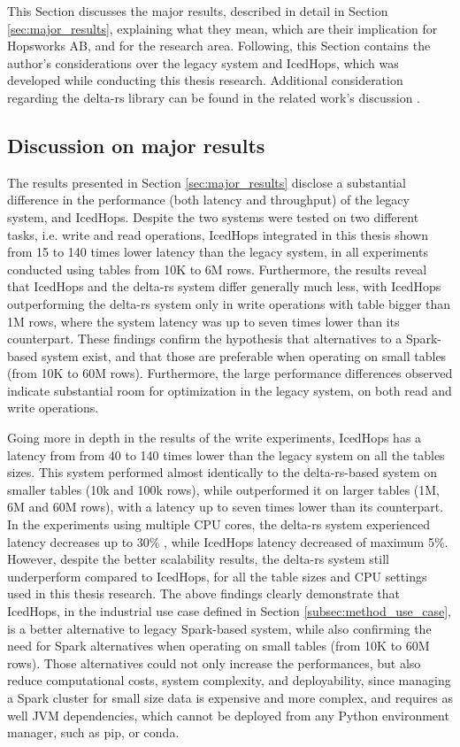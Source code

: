 This Section discusses the major results, described in detail in Section \ref{sec:major_results}, explaining what they mean, which are their implication for Hopsworks AB, and for the research area. Following, this Section contains the author's considerations over the legacy system and IcedHops, which was developed while conducting this thesis research. Additional consideration regarding the delta-rs library can be found in the related work's discussion \cite{manfrediReducingReadWrite2024}.



\subsection{Discussion on major results}
The results presented in Section \ref{sec:major_results} disclose a substantial difference in the performance (both latency and throughput) of the legacy system, and IcedHops. Despite the two systems were tested on two different tasks, i.e. write and read operations, IcedHops integrated in this thesis shown from 15 to 140 times lower latency than the legacy system, in all experiments conducted using tables from 10K to 6M rows. Furthermore, the results reveal that IcedHops and the delta-rs system differ generally much less, with IcedHops outperforming the delta-rs system only in write operations with table bigger than 1M rows, where the system latency was up to seven times lower than its counterpart. These findings confirm the hypothesis that alternatives to a Spark-based system exist, and that those are preferable when operating on small tables (from 10K to 60M rows). Furthermore, the large performance differences observed indicate substantial room for optimization in the legacy system, on both read and write operations.

Going more in depth in the results of the write experiments, IcedHops has a latency from from 40 to 140 times lower than the legacy system on all the tables sizes. This system performed almost identically to the delta-rs-based system on smaller tables (10k and 100k rows), while outperformed it on larger tables (1M, 6M and 60M rows), with a latency up to seven times lower than its counterpart. In the experiments using multiple \gls{CPU} cores, the delta-rs system experienced latency decreases up to 30\% , while IcedHops latency decreased of maximum 5\%. However, despite the better scalability results, the delta-rs system still underperform compared to IcedHops, for all the table sizes and \gls{CPU} settings used in this thesis research. The above findings clearly demonstrate that IcedHops, in the industrial use case defined in Section \ref{subsec:method_use_case}, is a better alternative to legacy Spark-based system, while also confirming the need for Spark alternatives when operating on small tables (from 10K to 60M rows). Those alternatives could not only increase the performances, but also reduce computational costs, system complexity, and deployability, since managing a Spark cluster for small size data is expensive and more complex, and requires as well \gls{JVM} dependencies, which cannot be deployed from any Python environment manager, such as pip, or conda.

